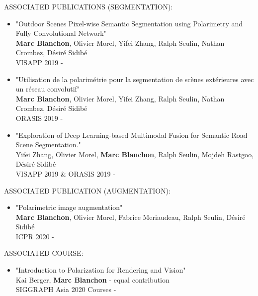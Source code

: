 \vspace*{8mm}
\hspace*{10mm} ASSOCIATED PUBLICATIONS (SEGMENTATION):
\begin{itemize}
	
	\item "Outdoor Scenes Pixel-wise Semantic Segmentation using Polarimetry and Fully Convolutional Network"\\
	\textbf{Marc Blanchon}, Olivier Morel, Yifei Zhang, Ralph Seulin, Nathan Crombez, D{\'e}sir{\'e} Sidib{\'e}\\
	VISAPP 2019 - \cite{blanchon2019outdoor}
	
	\item "Utilisation de la polarim{\'e}trie pour la segmentation de sc{\`e}nes ext{\'e}rieures avec un r{\'e}seau convolutif"\\
	\textbf{Marc Blanchon}, Olivier Morel, Yifei Zhang, Ralph Seulin, Nathan Crombez, D{\'e}sir{\'e} Sidib{\'e}\\
	ORASIS 2019 - \cite{blanchon2019utilisation}
	
	\item "Exploration of Deep Learning-based Multimodal Fusion for Semantic Road Scene Segmentation."\\
	Yifei Zhang, Olivier Morel, \textbf{Marc Blanchon}, Ralph Seulin, Mojdeh Rastgoo, D{\'e}sir{\'e} Sidib{\'e}\\
	VISAPP 2019 \&  ORASIS 2019 - \cite{zhang2019exploration,zhang2019explorationn}
	
\end{itemize}
\vspace*{8mm}
\hspace*{10mm} ASSOCIATED PUBLICATION (AUGMENTATION):
\begin{itemize}
	\item "Polarimetric image augmentation"\\
	\textbf{Marc Blanchon}, Olivier Morel, Fabrice Meriaudeau, Ralph Seulin, D{\'e}sir{\'e} Sidib{\'e}\\
	ICPR 2020 - \cite{blanchon2021polarimetric}
\end{itemize}
\vspace*{8mm}
\hspace*{10mm} ASSOCIATED COURSE:
\begin{itemize}
	\item "Introduction to Polarization for Rendering and Vision"\\
	Kai Berger, \textbf{Marc Blanchon} - equal contribution\\
		SIGGRAPH Asia 2020 Courses - \cite{blanchon2020intro}
\end{itemize}
